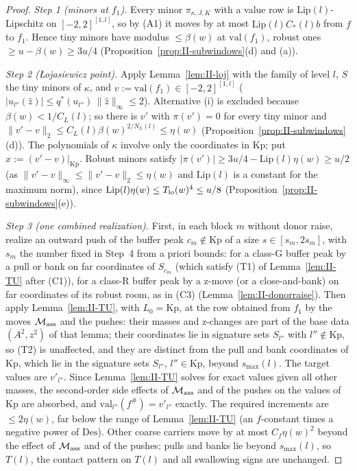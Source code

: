 \documentclass[10pt]{amsart}
\theoremstyle{definition}
\theoremstyle{remark}
\newcommand{\zh}{\hat z}
\begin{document}
\begin{proof}
\emph{Step 1 (minors at $f_1$).}  Every minor $\pi_{\kappa,J,K}$ with a value
row is $\mathrm{Lip}(l)$-Lipschitz on $[-2,2]^{[1,l]}$, so by (A1) it moves by
at most $\mathrm{Lip}(l)C_*(l)b$ from $f$ to $f_1$.  Hence tiny minors have
modulus $\le\beta(w)$ at $\mathrm{val}(f_1)$, robust ones $\ge u-\beta(w)\ge
3u/4$ (Proposition~\ref{prop:II-subwindows}(d) and (a)).

\emph{Step 2 ({\L}ojasiewicz point).}  Apply Lemma~\ref{lem:II-loj} with the
family of level $l$, $S$ the tiny minors of $\kappa$, and $v:=\mathrm{val}
(f_1)\in[-2,2]^{[1,l]}$ ($|u_{l''}(\zh)|\le q^*(u_{l''})\,\|\zh\|_\infty\le2$).
Alternative (i) is excluded because $\beta(w)<1/C_L(l)$; so there is $v'$
with $\pi(v')=0$ for every tiny minor and $\|v'-v\|_2\le C_L(l)\beta(w)^{2/N_L
(l)}\le\eta(w)$ (Proposition~\ref{prop:II-subwindows}(d)).  The polynomials of
$\kappa$ involve only the coordinates in $\mathrm{Kp}$; put $x:=(v'-v)
|_{\mathrm{Kp}}$.  Robust minors satisfy $|\pi(v')|\ge3u/4-\mathrm{Lip}(l)\eta(w)
\ge u/2$ (as $\|v'-v\|_\infty\le\|v'-v\|_2\le\eta(w)$ and $\mathrm{Lip}(l)$ is
a constant for the maximum norm), since $\mathrm{Lip}(l)\eta(w)\le T_{\rm lo}(w)^4\le u/8$
(Proposition~\ref{prop:II-subwindows}(e)).

\emph{Step 3 (one combined realization).}  First, in each block $m$
without donor raise, realize an outward push of the buffer peak
$c_m\notin\mathrm{Kp}$ of a size $s\in[s_m,2s_m]$, with $s_m$ the number
fixed in Step~4 from a priori bounds: for a class-G buffer peak by a pull
or bank on far coordinates of $S_{c_m}$ (which satisfy (T1) of
Lemma~\ref{lem:II-TU} after (C1)), for a class-R buffer peak by a z-move
(or a close-and-bank) on far coordinates of its robust room, as in (C3)
(Lemma~\ref{lem:II-donorraise}).  Then apply Lemma~\ref{lem:II-TU}, with
$L_0=\mathrm{Kp}$, at the row obtained from $f_1$ by the moves $\mathcal
M_{\rm ass}$ and the pushes: their masses and z-changes are part of the
base data $(A^2,z^2)$ of that lemma; their coordinates lie in signature
sets $S_{l''}$ with $l''\notin\mathrm{Kp}$, so (T2) is unaffected, and they
are distinct from the pull and bank coordinates of $\mathrm{Kp}$, which lie
in the signature sets $S_{l''}$, $l''\in\mathrm{Kp}$, beyond $s_{\max}(l)$.
The target values are $v'_{l''}$.  Since
Lemma~\ref{lem:II-TU} solves for exact values given all other masses, the
second-order side effects of $\mathcal M_{\rm ass}$ and of the pushes on the
values of $\mathrm{Kp}$ are absorbed, and $\mathrm{val}_{l''}(f^\#)=v'_{l''}$
exactly.  The required increments are $\le2\eta(w)$, far below the range of
Lemma~\ref{lem:II-TU} (an $f$-constant times a negative power of
$\mathrm{Des}$).  Other coarse carriers move by at most $C_f\eta(w)^2$ beyond
the effect of $\mathcal M_{\rm ass}$ and of the pushes; pulls and banks lie
beyond $s_{\max}(l)$, so $T(l)$, the contact pattern on $T(l)$ and all
swallowing signs are unchanged.


\end{proof}
\end{document}
